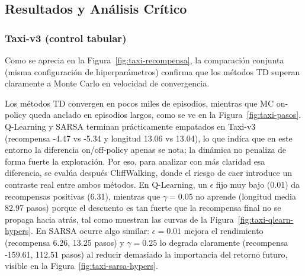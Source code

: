 \subsection{Resultados y Análisis Crítico}

\subsubsection*{Taxi-v3 (control tabular)}
Como se aprecia en la Figura~\ref{fig:taxi-recompensa}, la comparación conjunta (misma configuración de hiperparámetros) confirma que los métodos TD superan claramente a Monte Carlo en velocidad de convergencia.

\begin{table}[h]
\centering
{}
\caption{Resultados en Taxi-v3 (100k episodios).}
\end{table}

Los métodos TD convergen en pocos miles de episodios, mientras que MC on-policy queda anclado en episodios largos, como se ve en la Figura~\ref{fig:taxi-pasos}. Q-Learning y SARSA terminan prácticamente empatados en Taxi-v3 (recompensa -4.47 vs -5.34 y longitud 13.06 vs 13.04), lo que indica que en este entorno la diferencia on/off-policy apenas se nota; la dinámica no penaliza de forma fuerte la exploración. Por eso, para analizar con más claridad esa diferencia, se evalúa después CliffWalking, donde el riesgo de caer introduce un contraste real entre ambos métodos. En Q-Learning, un $\epsilon$ fijo muy bajo (0.01) da recompensas positivas (6.31), mientras que $\gamma=0.05$ no aprende (longitud media 82.97 pasos) porque el descuento es tan fuerte que la recompensa final no se propaga hacia atrás, tal como muestran las curvas de la Figura~\ref{fig:taxi-qlearn-hypers}. En SARSA ocurre algo similar: $\epsilon=0.01$ mejora el rendimiento (recompensa 6.26, 13.25 pasos) y $\gamma=0.25$ lo degrada claramente (recompensa -159.61, 112.51 pasos) al reducir demasiado la importancia del retorno futuro, visible en la Figura~\ref{fig:taxi-sarsa-hypers}.

